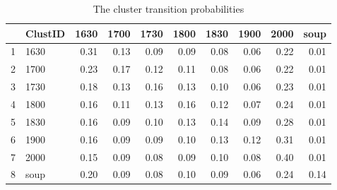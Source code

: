 \begin{table}[ht]
\centering
\begin{tabular}{rlrrrrrrrr}
  \hline
 & ClustID & 1630 & 1700 & 1730 & 1800 & 1830 & 1900 & 2000 & soup \\ 
  \hline
1 & 1630 & 0.31 & 0.13 & 0.09 & 0.09 & 0.08 & 0.06 & 0.22 & 0.01 \\ 
  2 & 1700 & 0.23 & 0.17 & 0.12 & 0.11 & 0.08 & 0.06 & 0.22 & 0.01 \\ 
  3 & 1730 & 0.18 & 0.13 & 0.16 & 0.13 & 0.10 & 0.06 & 0.23 & 0.01 \\ 
  4 & 1800 & 0.16 & 0.11 & 0.13 & 0.16 & 0.12 & 0.07 & 0.24 & 0.01 \\ 
  5 & 1830 & 0.16 & 0.09 & 0.10 & 0.13 & 0.14 & 0.09 & 0.28 & 0.01 \\ 
  6 & 1900 & 0.16 & 0.09 & 0.09 & 0.10 & 0.13 & 0.12 & 0.31 & 0.01 \\ 
  7 & 2000 & 0.15 & 0.09 & 0.08 & 0.09 & 0.10 & 0.08 & 0.40 & 0.01 \\ 
  8 & soup & 0.20 & 0.09 & 0.08 & 0.10 & 0.09 & 0.06 & 0.24 & 0.14 \\ 
   \hline
\end{tabular}
\caption{The cluster transition probabilities} 
\label{tab:clustrans}
\end{table}
